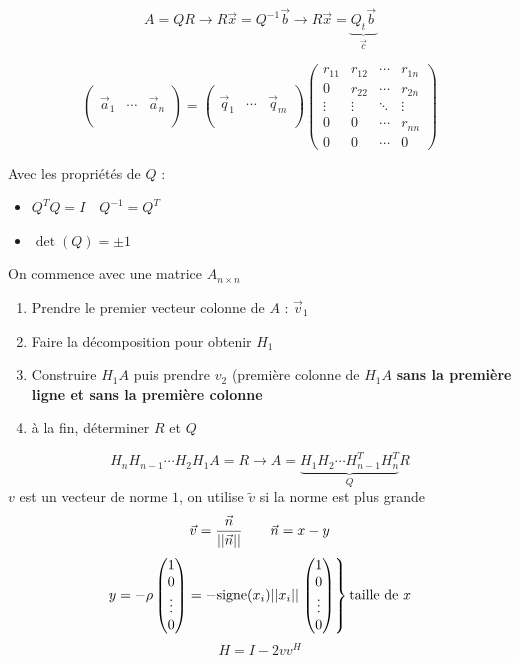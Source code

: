 \documentclass[resume]{subfiles}
\begin{document}
$$A=QR\longrightarrow R\vec{x}=Q^{-1}\vec{b}\longrightarrow R\vec{x}=\underbrace{Q_t\vec{b}}_{\vec{c}}$$
\begin{scriptsize}
$$\begin{pmatrix}
\\
\vec{a}_1 & \cdots & \vec{a}_n\\
\\
\end{pmatrix}=\begin{pmatrix}\\
\vec{q}_1 & \cdots & \vec{q}_m\\
\\
\end{pmatrix}\begin{pmatrix}
r_{11} & r_{12} & \cdots & r_{1n}\\
0 & r_{22} & \cdots & r_{2n}\\
\vdots & \vdots & \ddots & \vdots\\
0 & 0 & \cdots & r_{nn}\\
0 & 0 & \cdots & 0
\end{pmatrix}$$
\end{scriptsize}
Avec les propriétés de $Q$ :
\begin{itemize}
\item $Q^TQ=I\quad Q^{-1}=Q^T$
\item $\det(Q)=\pm 1$
\end{itemize}







On commence avec une matrice $A_{n\times n}$
\begin{enumerate}
\item Prendre le premier vecteur colonne de $A$ : $\vec{v}_1$
\item Faire la décomposition pour obtenir $H_1$
\item Construire $H_1A$ puis prendre $v_2$ (première colonne de $H_1A$ \textbf{sans la première ligne et sans la première colonne}
\item à la fin, déterminer $R$ et $Q$
\end{enumerate}
$$H_nH_{n-1}\cdots H_2H_1A=R\longrightarrow A=\underbrace{H_1H_2\cdots H_{n-1}^TH_n^T}_{Q}R$$
$v$ est un vecteur de norme $1$, on utilise $\tilde{v}$ si la norme est plus grande
$$\vec{v}=\frac{\vec{n}}{\abs{\abs{\vec{n}}}}\qquad \vec{n}=x-y$$
$$y=\textcolor{OrangeRed}{-}\rho\begin{pmatrix}
1\\0\\\vdots\\0
\end{pmatrix}=\textcolor{OrangeRed}{-}\text{signe}(x_i)\abs{\abs{x_i}}\left.\begin{pmatrix}
1\\0\\\vdots\\0
\end{pmatrix}\right\rbrace\text{taille de }x$$
$$H=I-2vv^{H}$$
\end{document}
